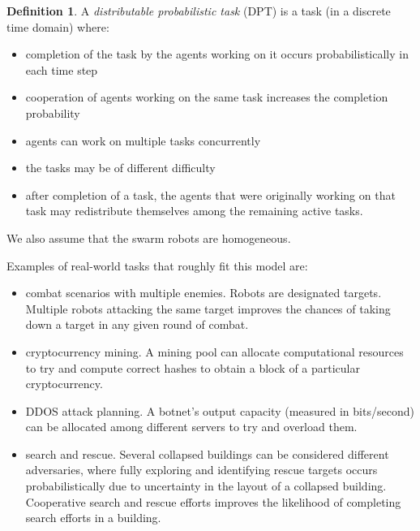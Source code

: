 \documentclass[11pt]{article}
\theoremstyle{definition}
\newtheorem{defn}{Definition}
\begin{document}
\begin{defn}
    A \emph{distributable probabilistic task}
    (DPT) is a task (in a discrete time domain)
    where:

    \begin{itemize}
        \item completion of the task by
            the agents working on it
            occurs probabilistically in
            each time step
        \item cooperation of agents working
            on the same task increases the
            completion probability
        \item agents can work on multiple
            tasks concurrently
        \item the tasks may be of different
            difficulty
        \item after completion of a task,
            the agents that were originally
            working on that task may
            redistribute themselves
            among the remaining active tasks.
    \end{itemize}

    We also assume that the swarm robots
    are homogeneous.
\end{defn}

Examples of real-world tasks that roughly
fit this model are:

\begin{itemize}
    \item combat scenarios with multiple enemies.
        Robots are designated targets. Multiple
        robots attacking the same target
        improves the chances of taking down
        a target in any given round of combat.
    \item cryptocurrency mining. A mining pool
        can allocate computational resources to
        try and compute correct hashes to
        obtain a block of a particular
        cryptocurrency.
    \item DDOS attack planning. A botnet's
        output capacity (measured in bits/second)
        can be allocated among different servers
        to try and overload them.
    \item search and rescue. Several collapsed
        buildings can be considered different
        adversaries, where fully exploring
        and identifying rescue targets occurs
        probabilistically due to uncertainty
        in the layout of a collapsed building.
        Cooperative search and rescue efforts improves
        the likelihood of completing search efforts
        in a building.
\end{itemize}
\end{document}
